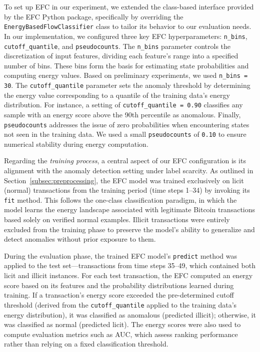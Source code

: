 \documentclass[12pt]{article}
\begin{document}
To set up EFC in our experiment, we extended the class-based interface provided by the EFC Python package, specifically
by overriding the \texttt{EnergyBasedFlowClassifier} class to tailor its behavior to our evaluation needs. In our implementation,
we configured three key EFC hyperparameters: \texttt{n\_bins}, \texttt{cutoff\_quantile}, and \texttt{pseudocounts}.
The \texttt{n\_bins} parameter controls the discretization of input features, dividing each feature's range into a specified
number of bins. These bins form the basis for estimating state probabilities and computing energy values. Based on preliminary
experiments, we used \texttt{n\_bins = 30}. The \texttt{cutoff\_quantile} parameter sets the anomaly
threshold by determining the energy value corresponding to a quantile of the training data's energy distribution. For instance,
a setting of \texttt{cutoff\_quantile = 0.90} classifies any sample with an energy score above the 90th percentile as anomalous.
Finally, \texttt{pseudocounts} addresses the issue of zero probabilities when encountering states not seen in the training
data. We used a small \texttt{pseudocounts} of \texttt{0.10} to ensure numerical stability during energy computation.

Regarding the \emph{training process}, a central aspect of our EFC configuration is its alignment with the anomaly detection
setting under label scarcity. As outlined in Section~\ref{subsec:preprocessing}, the EFC model was trained exclusively on
licit (normal) transactions from the training period (time steps 1--34) by invoking its \texttt{fit} method. This follows
the one-class classification paradigm, in which the model learns the energy landscape associated with legitimate Bitcoin
transactions based solely on verified normal examples. Illicit transactions were entirely excluded from the training phase
to preserve the model's ability to generalize and detect anomalies without prior exposure to them.

During the evaluation phase, the trained EFC model's \texttt{predict} method was applied to the test set---transactions
from time steps 35--49, which contained both licit and illicit instances. For each test transaction, the EFC computed an
energy score based on its features and the probability distributions learned during training. If a transaction's energy
score exceeded the pre-determined cutoff threshold (derived from the \texttt{cutoff\_quantile} applied to the training data's
energy distribution), it was classified as anomalous (predicted illicit); otherwise, it was classified as normal (predicted licit).
The energy scores were also used to compute evaluation metrics such as AUC, which assess ranking performance rather than
relying on a fixed classification threshold.
\end{document}
